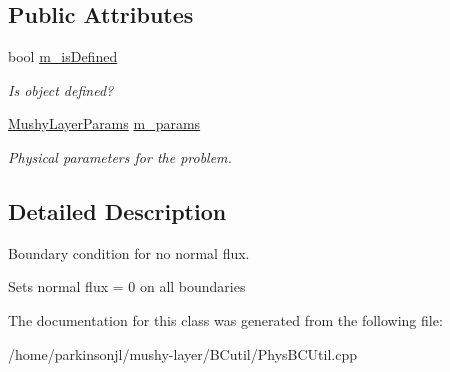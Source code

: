 \subsection*{Public Attributes}
\begin{DoxyCompactItemize}
\item 
\mbox{\label{class_no_flux_b_c_function_abcfc09a4099e8a362e2b2106d894fee5}} 
bool \hyperlink{class_no_flux_b_c_function_abcfc09a4099e8a362e2b2106d894fee5}{m\+\_\+is\+Defined}
\begin{DoxyCompactList}\small\item\em Is object defined? \end{DoxyCompactList}\item 
\mbox{\label{class_no_flux_b_c_function_a2248e0ef0368d0a188a6baf8d7dd4682}} 
\hyperlink{class_mushy_layer_params}{Mushy\+Layer\+Params} \hyperlink{class_no_flux_b_c_function_a2248e0ef0368d0a188a6baf8d7dd4682}{m\+\_\+params}
\begin{DoxyCompactList}\small\item\em Physical parameters for the problem. \end{DoxyCompactList}\end{DoxyCompactItemize}


\subsection{Detailed Description}
Boundary condition for no normal flux. 

Sets normal flux = 0 on all boundaries 

The documentation for this class was generated from the following file\+:\begin{DoxyCompactItemize}
\item 
/home/parkinsonjl/mushy-\/layer/\+B\+Cutil/Phys\+B\+C\+Util.\+cpp\end{DoxyCompactItemize}
